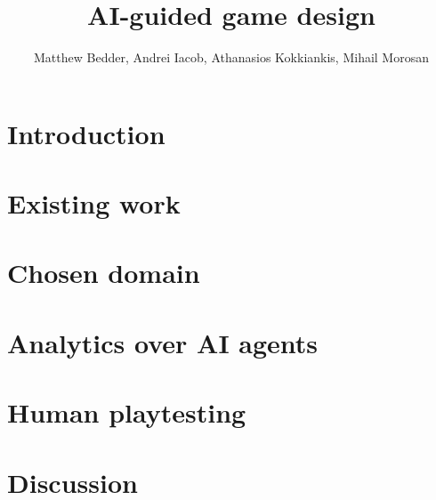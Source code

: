 \documentclass[9pt]{IEEEtran}
\title{AI-guided game design}
\author{Matthew Bedder, Andrei Iacob, Athanasios Kokkiankis, Mihail Morosan}
\begin{document}
\maketitle
\section{Introduction}

\section{Existing work}

\section{Chosen domain}

\section{Analytics over AI agents}

\section{Human playtesting}

\section{Discussion}




\end{document}
